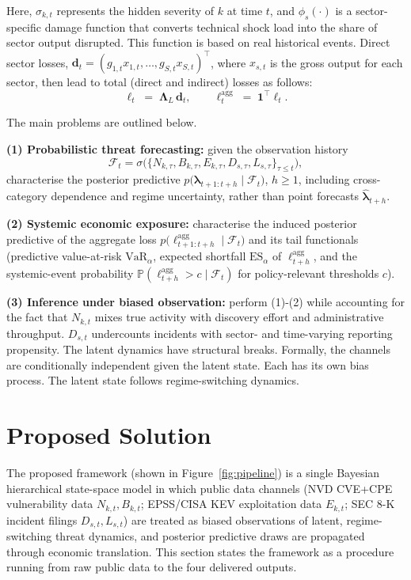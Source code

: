 \documentclass[review]{elsarticle}
\newcommand{\Prob}{\mathbb{P}}
\begin{document}
Here, $\sigma_{k,t}$ represents the hidden severity of $k$ at time $t$, and $\phi_s(\cdot)$ is a sector-specific damage function that converts technical shock load into the share of sector output disrupted. This function is based on real historical events. Direct sector losses, $\bm{d}_t = (g_{1,t} x_{1,t}, \dots, g_{S,t} x_{S,t})^\top$, where $x_{s,t}$ is the gross output for each sector, then lead to total (direct and indirect) losses as follows:
\begin{equation}\label{eq:leontief}
    \bm{\ell}_t \;=\; \bm{\Lambda}_L\, \bm{d}_t,
    \qquad
    \ell_t^{\mathrm{agg}} \;=\; \bm{1}^\top \bm{\ell}_t .
\end{equation}

The main problems are outlined below.

\textbf{(1) Probabilistic threat forecasting:} given the observation history
\[
\mathcal{F}_t = \sigma\big(\{N_{k,\tau}, B_{k,\tau}, E_{k,\tau}, D_{s,\tau}, L_{s,\tau}\}_{\tau \le t}\big),
\]
characterise the posterior predictive $p\big(\bm{\lambda}_{t+1:t+h} \mid \mathcal{F}_t\big)$, $h \geq 1$, including cross-category dependence and regime uncertainty, rather than point forecasts $\hat{\bm{\lambda}}_{t+h}$. 

\textbf{(2) Systemic economic exposure:} characterise the induced posterior predictive of the aggregate loss $p\big(\ell^{\mathrm{agg}}_{t+1:t+h} \mid \mathcal{F}_t\big)$ and its tail functionals (predictive value-at-risk $\mathrm{VaR}_{\alpha}$, expected shortfall $\mathrm{ES}_{\alpha}$ of $\ell^{\mathrm{agg}}_{t+h}$, and the systemic-event probability $\Prob(\ell^{\mathrm{agg}}_{t+h} > c \mid \mathcal{F}_t)$ for policy-relevant thresholds $c$). 

\textbf{(3) Inference under biased observation:} perform (1)-(2) while accounting for the fact that $N_{k,t}$ mixes true activity with discovery effort and administrative throughput. $D_{s,t}$ undercounts incidents with sector- and time-varying reporting propensity. The latent dynamics have structural breaks. Formally, the channels are conditionally independent given the latent state. Each has its own bias process. The latent state follows regime-switching dynamics.


\section{Proposed Solution}\label{sec:solution}
The proposed framework (shown in Figure~\ref{fig:pipeline}) is a single Bayesian hierarchical state-space model in which public data channels (NVD CVE+CPE vulnerability data $N_{k,t}, B_{k,t}$; EPSS/CISA KEV exploitation data $E_{k,t}$; SEC 8-K incident filings $D_{s,t}, L_{s,t}$) are treated as biased observations of latent, regime-switching threat dynamics, and posterior predictive draws are propagated through economic translation. This section states the framework as a procedure running from raw public data to the four delivered outputs.
\end{document}
